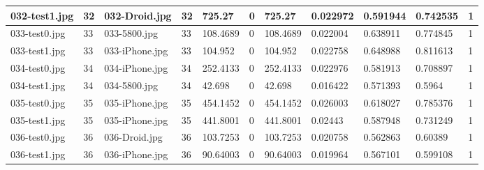 \begin{landscape}
\begin{longtable}{|p{2cm}|p{1cm}|p{2cm}|p{1cm}|p{2cm}|p{1cm}|p{2cm}|p{2cm}|p{2cm}|p{2cm}|p{1cm}|}
		032-test1.jpg   & 32               & 032-Droid.jpg         & 32                          & 725.27                & 0                       & 725.27                     & 0.022972              & 0.591944              & 0.742535                 & 1                \\ \hline
		033-test0.jpg   & 33               & 033-5800.jpg          & 33                          & 108.4689              & 0                       & 108.4689                   & 0.022004              & 0.638911              & 0.774845                 & 1                \\ \hline
		033-test1.jpg   & 33               & 033-iPhone.jpg        & 33                          & 104.952               & 0                       & 104.952                    & 0.022758              & 0.648988              & 0.811613                 & 1                \\ \hline
		034-test0.jpg   & 34               & 034-iPhone.jpg        & 34                          & 252.4133              & 0                       & 252.4133                   & 0.022976              & 0.581913              & 0.708897                 & 1                \\ \hline
		034-test1.jpg   & 34               & 034-5800.jpg          & 34                          & 42.698                & 0                       & 42.698                     & 0.016422              & 0.571393              & 0.5964                   & 1                \\ \hline
		035-test0.jpg   & 35               & 035-iPhone.jpg        & 35                          & 454.1452              & 0                       & 454.1452                   & 0.026003              & 0.618027              & 0.785376                 & 1                \\ \hline
		035-test1.jpg   & 35               & 035-iPhone.jpg        & 35                          & 441.8001              & 0                       & 441.8001                   & 0.02443               & 0.587948              & 0.731249                 & 1                \\ \hline
		036-test0.jpg   & 36               & 036-Droid.jpg         & 36                          & 103.7253              & 0                       & 103.7253                   & 0.020758              & 0.562863              & 0.60389                  & 1                \\ \hline
		036-test1.jpg   & 36               & 036-iPhone.jpg        & 36                          & 90.64003              & 0                       & 90.64003                   & 0.019964              & 0.567101              & 0.599108                 & 1                \\ \hline

\end{longtable}
\end{landscape}
